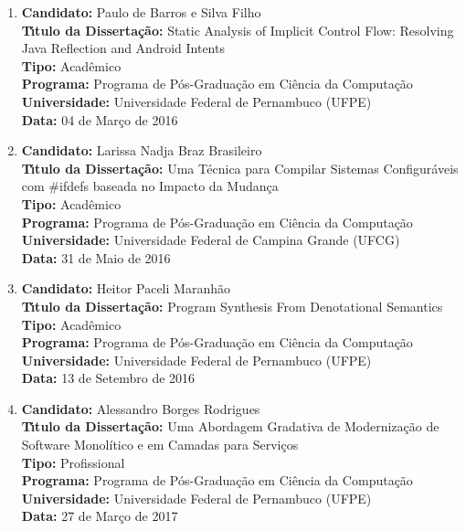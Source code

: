 \documentclass[a4paper,oneside,10pt]{article}
\begin{document}
\begin{enumerate}
\item       \textbf{Candidato:} Paulo de Barros e Silva Filho \mbox{} \\
            \textbf{T\'{\i}tulo da Disserta\c{c}\~{a}o:} Static Analysis of Implicit Control Flow: Resolving Java Reflection and Android Intents\\
            \textbf{Tipo:} Acadêmico\\
            \textbf{Programa:} Programa de Pós-Graduação em Ciência da Computação\\
            \textbf{Universidade:} Universidade Federal de Pernambuco (UFPE)\\
            \textbf{Data:} 04 de Março de 2016

\item       \textbf{Candidato:} Larissa Nadja Braz Brasileiro \mbox{} \\
            \textbf{T\'{\i}tulo da Disserta\c{c}\~{a}o:} Uma Técnica para Compilar Sistemas Configuráveis com \#ifdefs baseada no Impacto da Mudança\\
            \textbf{Tipo:} Acadêmico\\
            \textbf{Programa:} Programa de Pós-Graduação em Ciência da Computação\\
            \textbf{Universidade:} Universidade Federal de Campina Grande (UFCG)\\
            \textbf{Data:} 31 de Maio de 2016

\item       \textbf{Candidato:} Heitor Paceli Maranhão \mbox{} \\
            \textbf{T\'{\i}tulo da Disserta\c{c}\~{a}o:} Program Synthesis From Denotational Semantics\\
            \textbf{Tipo:} Acadêmico\\
            \textbf{Programa:} Programa de Pós-Graduação em Ciência da Computação\\
            \textbf{Universidade:} Universidade Federal de Pernambuco (UFPE)\\
            \textbf{Data:} 13 de Setembro de 2016

\item       \textbf{Candidato:} Alessandro Borges Rodrigues \mbox{} \\
            \textbf{T\'{\i}tulo da Disserta\c{c}\~{a}o:} Uma Abordagem Gradativa de Modernização de Software Monolítico e em Camadas para Serviços\\
            \textbf{Tipo:} Profissional\\
            \textbf{Programa:} Programa de Pós-Graduação em Ciência da Computação\\
            \textbf{Universidade:} Universidade Federal de Pernambuco (UFPE)\\
            \textbf{Data:} 27 de Março de 2017


\end{enumerate}
\end{document}
